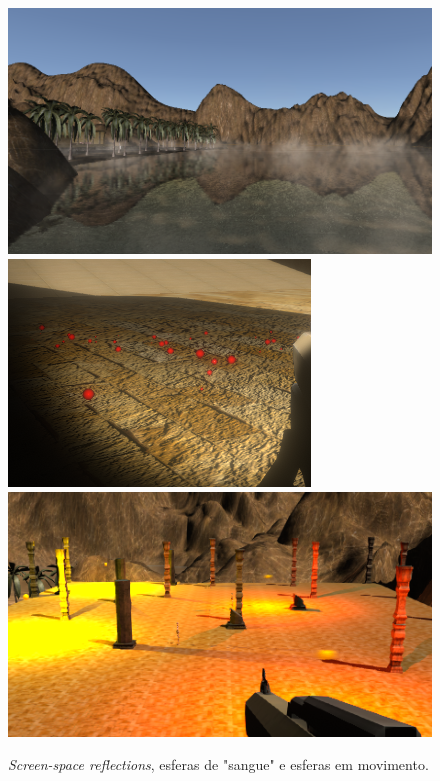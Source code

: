 \documentclass{article}
\begin{document}
        \begin{figure}[h]\begin{center}
            \includegraphics[scale=0.2]{Screenshot_12.png}
            \includegraphics[scale=0.445]{Screenshot_19.png}
            \includegraphics[scale=0.38]{Screenshot_23.png}
            \caption{\textit{Screen-space reflections}, esferas de "sangue" e esferas em movimento.}
        \end{center}\end{figure}
\end{document}
